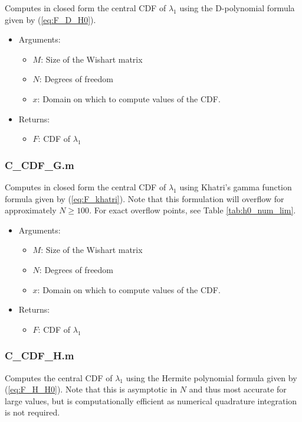 Computes in closed form the central CDF of $\lambda_1$ using the D-polynomial formula given by (\ref{eq:F_D_H0}).

\begin{itemize}
\item Arguments:
\begin{itemize}
\item $M$: Size of the Wishart matrix
\item $N$: Degrees of freedom
\item $x$: Domain on which to compute values of the CDF.
\end{itemize}
\item Returns:
\begin{itemize}
\item $F$: CDF of $\lambda_1$
\end{itemize}
\end{itemize}

\subsubsection*{C\_CDF\_G.m}

Computes in closed form the central CDF of $\lambda_1$ using Khatri's gamma function formula given by (\ref{eq:F_khatri}). Note that this formulation will overflow for approximately $N \geq 100$. For exact overflow points, see Table \ref{tab:h0_num_lim}.

\begin{itemize}
\item Arguments:
\begin{itemize}
\item $M$: Size of the Wishart matrix
\item $N$: Degrees of freedom
\item $x$: Domain on which to compute values of the CDF.
\end{itemize}
\item Returns:
\begin{itemize}
\item $F$: CDF of $\lambda_1$
\end{itemize}
\end{itemize}


\subsubsection*{C\_CDF\_H.m}

Computes the central CDF of $\lambda_1$ using the Hermite polynomial formula given by (\ref{eq:F_H_H0}). Note that this is asymptotic in $N$ and thus most accurate for large values, but is computationally efficient as numerical quadrature integration is not required.

